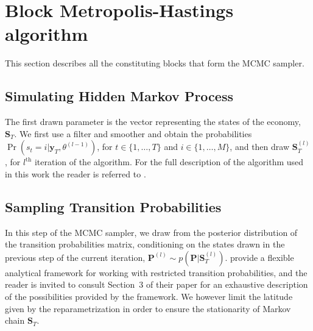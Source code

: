 \documentclass[final,3p,authoryear]{elsarticle}
\begin{document}
\section{Block Metropolis-Hastings algorithm}\label{app:BMHA}



\noindent
This section describes all the constituting blocks that form the MCMC sampler.


\subsection{Simulating Hidden Markov Process}\label{ssec:states}


\noindent
The first drawn parameter is the vector representing the states of the economy, $\mathbf{S}_T$. We first use a filter and smoother \citep[see Section 11.2 of][ and references therein]{Fruhwirth-Schnatter2006} and obtain the probabilities $\Pr(s_t = i|\mathbf{y}_T , \theta^{(l-1)})$, for $t\in\{1,\dots,T\}$ and $i\in\{1,\dots,M\}$, and then draw $\mathbf{S}_T^{(l)}$, for $l^{\text{th}}$ iteration of the algorithm. For the full description of the algorithm used in this work the reader is referred to \cite{Droumaguet2012}.


\subsection{Sampling Transition Probabilities}


\noindent
In this step of the MCMC sampler, we draw from the posterior distribution of the transition probabilities matrix, conditioning on the states drawn in the previous step of the current iteration, $\mathbf{P}^{(l)} \sim p(\mathbf{P}|\mathbf{S}_T^{(l)})$. \cite{Sims2008} provide a flexible analytical framework for working with restricted transition probabilities, and the reader is invited to consult Section~3 of their paper for an exhaustive description of the possibilities provided by the framework. We however limit the latitude given by the reparametrization in order to ensure  the stationarity of Markov chain $\mathbf{S}_T$.
\end{document}
